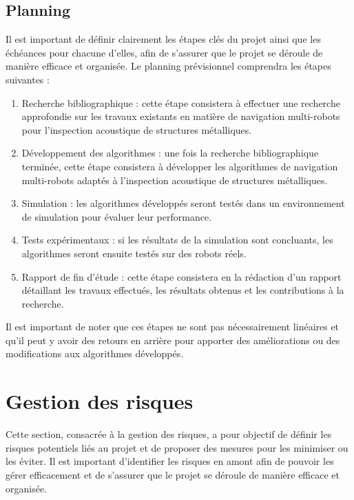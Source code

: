 \documentclass[init,francais,RandD]{rapportPFE}  %
\begin{document}
		\subsection{Planning}
			Il est important de définir clairement les étapes clés du projet ainsi que les échéances pour chacune d'elles, afin de s'assurer que le projet se déroule de manière efficace et organisée. Le planning prévisionnel comprendra les étapes suivantes :
			\begin{enumerate}
				\item Recherche bibliographique : cette étape consistera à effectuer une recherche approfondie sur les travaux existants en matière de navigation multi-robots pour l'inspection acoustique de structures métalliques.
				\item Développement des algorithmes : une fois la recherche bibliographique terminée, cette étape consistera à développer les algorithmes de navigation multi-robots adaptés à l'inspection acoustique de structures métalliques.
				\item Simulation : les algorithmes développés seront testés dans un environnement de simulation pour évaluer leur performance.
				\item Tests expérimentaux : si les résultats de la simulation sont concluants, les algorithmes seront ensuite testés sur des robots réels.
				\item Rapport de fin d'étude : cette étape consistera en la rédaction d'un rapport détaillant les travaux effectués, les résultats obtenus et les contributions à la recherche.
			\end{enumerate}
			Il est important de noter que ces étapes ne sont pas nécessairement linéaires et qu'il peut y avoir des retours en arrière pour apporter des améliorations ou des modifications aux algorithmes développés.
	\section{Gestion des risques}
		Cette section, consacrée à la gestion des risques, a pour objectif de définir les risques potentiels liés au projet et de proposer des mesures pour les minimiser ou les éviter. Il est important d'identifier les risques en amont afin de pouvoir les gérer efficacement et de s'assurer que le projet se déroule de manière efficace et organisée.
\end{document}
